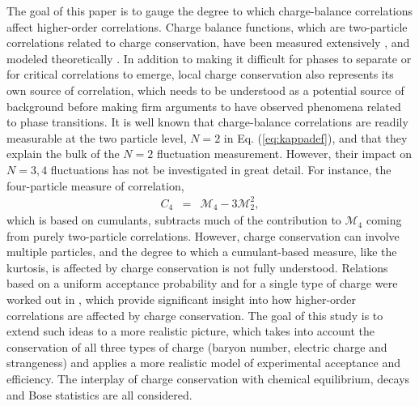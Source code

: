 The goal of this paper is to gauge the degree to which charge-balance correlations affect higher-order correlations. Charge balance functions, which are two-particle correlations related to charge conservation, have been measured extensively \cite{Wang:2012jua,Abelev:2010ab,Li:2011zzx,Alt:2007hk,Adams:2003kg,Aggarwal:2010ya,Alt:2004gx,Abelev:2013csa,Adamczyk:2015yga,Adamczyk:2013hsi,Abelev:2009ac}, and modeled theoretically \cite{Bass:2000az,Bozek:2004dt,Bozek:2003qi,Pratt:2015jsa,Pratt:2017oyf,Ling:2013ksb,Cheng:2004zy,Pratt:2012dz}. In addition to making it difficult for phases to separate or for critical correlations to emerge, local charge conservation also represents its own source of correlation, which needs to be understood as a potential source of background before making firm arguments to have observed phenomena related to phase transitions. It is well known that charge-balance correlations are readily measurable at the two particle level, $N=2$ in Eq. (\ref{eq:kappadef}), and that they explain the bulk of the $N=2$ fluctuation measurement. However, their impact on $N=3,4$ fluctuations has not be investigated in great detail. For instance, the four-particle measure of correlation,
\begin{eqnarray}
C_4&=&\mathcal{M}_4-3\mathcal{M}_2^2,
\end{eqnarray}
which is based on cumulants, subtracts much of the contribution to $\mathcal{M}_4$ coming from purely two-particle correlations. However, charge conservation can involve multiple particles, and the degree to which a cumulant-based measure, like the kurtosis, is affected by charge conservation is not fully understood. Relations based on a uniform acceptance probability and for a single type of charge were worked out in \cite{Savchuk:2019xfg}, which provide significant insight into how higher-order correlations are affected by charge conservation. The goal of this study is to extend such ideas to a more realistic picture, which takes into account the conservation of all three types of charge (baryon number, electric charge and strangeness) and applies a more realistic model of experimental acceptance and efficiency. The interplay of charge conservation with chemical equilibrium, decays and Bose statistics are all considered.

